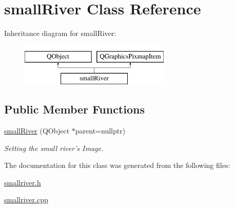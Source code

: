 \hypertarget{classsmallRiver}{\section{small\-River Class Reference}
\label{classsmallRiver}
}
Inheritance diagram for small\-River\-:\begin{figure}[H]
\begin{center}
\leavevmode
\includegraphics[height=2.000000cm]{classsmallRiver}
\end{center}
\end{figure}
\subsection*{Public Member Functions}
\begin{DoxyCompactItemize}
\item 
\hypertarget{classsmallRiver_ac7dfbda2dce90b878b6b1d7289b6fd5b}{\hyperlink{classsmallRiver_ac7dfbda2dce90b878b6b1d7289b6fd5b}{small\-River} (Q\-Object $\ast$parent=nullptr)}\label{classsmallRiver_ac7dfbda2dce90b878b6b1d7289b6fd5b}

\begin{DoxyCompactList}\small\item\em Setting the small river's Image. \end{DoxyCompactList}\end{DoxyCompactItemize}


The documentation for this class was generated from the following files\-:\begin{DoxyCompactItemize}
\item 
\hyperlink{smallriver_8h}{smallriver.\-h}\item 
\hyperlink{smallriver_8cpp}{smallriver.\-cpp}\end{DoxyCompactItemize}
